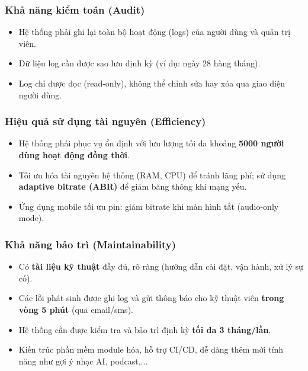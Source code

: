 \documentclass[a4paper]{article}
\begin{document}
\subsubsection{Khả năng kiểm toán (Audit)}
\begin{itemize}
	\item Hệ thống phải ghi lại toàn bộ hoạt động (logs) của người dùng và quản trị viên.
	\item Dữ liệu log cần được sao lưu định kỳ (ví dụ: ngày 28 hàng tháng).
	\item Log chỉ được đọc (read-only), không thể chỉnh sửa hay xóa qua giao diện người dùng.
\end{itemize}

\subsubsection{Hiệu quả sử dụng tài nguyên (Efficiency)}
\begin{itemize}
	\item Hệ thống phải phục vụ ổn định với lưu lượng tối đa khoảng \textbf{5000 người dùng hoạt động đồng thời}.
	\item Tối ưu hóa tài nguyên hệ thống (RAM, CPU) để tránh lãng phí; sử dụng \textbf{adaptive bitrate (ABR)} để giảm băng thông khi mạng yếu.
	\item Ứng dụng mobile tối ưu pin: giảm bitrate khi màn hình tắt (audio-only mode).
\end{itemize}

\subsubsection{Khả năng bảo trì (Maintainability)}
\begin{itemize}
	\item Có \textbf{tài liệu kỹ thuật} đầy đủ, rõ ràng (hướng dẫn cài đặt, vận hành, xử lý sự cố).
	\item Các lỗi phát sinh được ghi log và gửi thông báo cho kỹ thuật viên \textbf{trong vòng 5 phút} (qua email/sms).
	\item Hệ thống cần được kiểm tra và bảo trì định kỳ \textbf{tối đa 3 tháng/lần}.
	\item Kiến trúc phần mềm module hóa, hỗ trợ CI/CD, dễ dàng thêm mới tính năng như gợi ý nhạc AI, podcast,...
\end{itemize}

\end{document}
